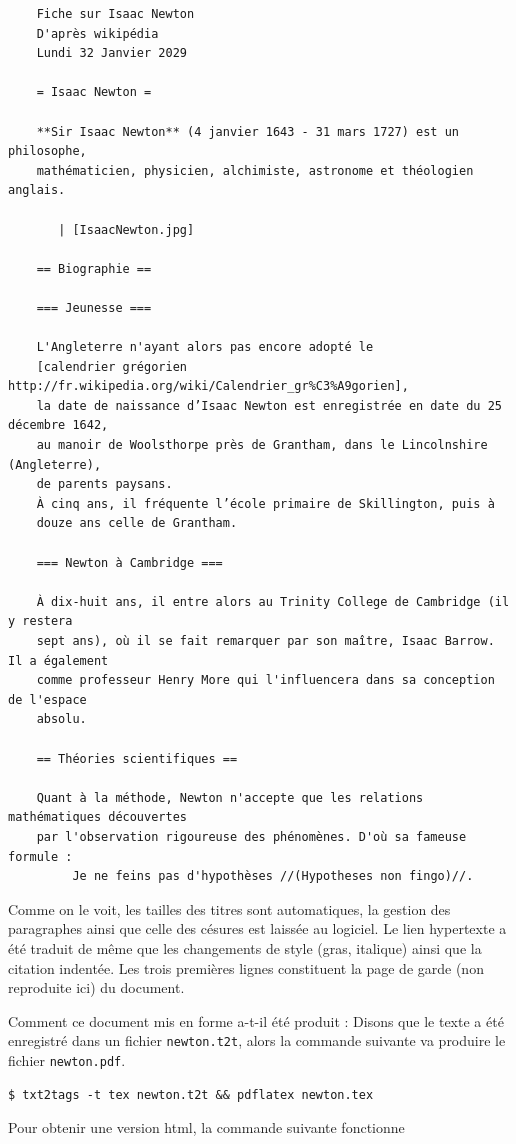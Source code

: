 \documentclass[12pt]{article}
\begin{document}
\begin{verbatim}
    Fiche sur Isaac Newton 
    D'après wikipédia
    Lundi 32 Janvier 2029

    = Isaac Newton =

    **Sir Isaac Newton** (4 janvier 1643 - 31 mars 1727) est un philosophe,
    mathématicien, physicien, alchimiste, astronome et théologien anglais.

       | [IsaacNewton.jpg]

    == Biographie ==

    === Jeunesse ===

    L'Angleterre n'ayant alors pas encore adopté le 
    [calendrier grégorien http://fr.wikipedia.org/wiki/Calendrier_gr%C3%A9gorien],
    la date de naissance d’Isaac Newton est enregistrée en date du 25 décembre 1642,
    au manoir de Woolsthorpe près de Grantham, dans le Lincolnshire (Angleterre),
    de parents paysans. 
    À cinq ans, il fréquente l’école primaire de Skillington, puis à
    douze ans celle de Grantham.

    === Newton à Cambridge ===

    À dix-huit ans, il entre alors au Trinity College de Cambridge (il y restera
    sept ans), où il se fait remarquer par son maître, Isaac Barrow. Il a également
    comme professeur Henry More qui l'influencera dans sa conception de l'espace
    absolu.

    == Théories scientifiques ==

    Quant à la méthode, Newton n'accepte que les relations mathématiques découvertes
    par l'observation rigoureuse des phénomènes. D'où sa fameuse formule :
         Je ne feins pas d'hypothèses //(Hypotheses non fingo)//.
\end{verbatim}
Comme on le voit, les tailles des titres sont automatiques, la gestion
des paragraphes ainsi que celle des césures est laissée au logiciel. Le
lien hypertexte a été traduit de même que les changements de style
(gras, italique) ainsi que la citation indentée. Les trois premières
lignes constituent la page de garde (non reproduite ici) du document.

Comment ce document mis en forme a-t-il été produit : Disons que le
texte a été enregistré dans un fichier \texttt{newton.t2t}, alors la
commande suivante va produire le fichier \texttt{newton.pdf}.

\begin{verbatim}
$ txt2tags -t tex newton.t2t && pdflatex newton.tex
\end{verbatim}
Pour obtenir une version html, la commande suivante fonctionne
\end{document}
